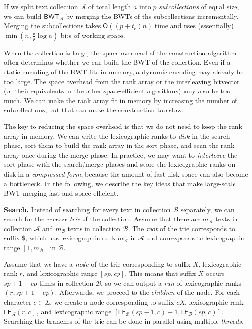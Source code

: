 \documentclass[smallabstract,smallcaptions]{dccpaper}
\newcommand{\Oh}{\ensuremath{\mathsf{O}}}
\newcommand{\BWT}{\textsf{BWT}}
\newcommand{\mBWT}{\ensuremath{\mathsf{BWT}}}
\newcommand{\mLF}{\ensuremath{\mathsf{LF}}}
\newcommand{\Acoll}{\ensuremath{\mathcal{A}}}
\newcommand{\Bcoll}{\ensuremath{\mathcal{B}}}
\begin{document}
\Section{Large-scale \BWT{} merging}

If we split text collection $\Acoll$ of total length $n$ into $p$ \emph{subcollections} of equal size, we can build $\mBWT_{\Acoll}$ by merging the \BWT{}s of the subcollections incrementally. Merging the subcollections takes $\Oh((p+t_{r})n)$ time and uses (essentially) $\min(n, \frac{n}{p} \log n)$ bits of working space.

When the collection is large, the space overhead of the construction algorithm often determines whether we can build the \BWT{} of the collection. Even if a static encoding of the \BWT{} fits in memory, a dynamic encoding may already be too large. The space overhead from the rank array or the interleaving bitvector (or their equivalents in the other space-efficient algorithms) may also be too much. We can make the rank array fit in memory by increasing the number of subcollections, but that can make the construction too slow.

The key to reducing the space overhead is that we do not need to keep the rank array in memory. We can write the lexicographic ranks to \emph{disk} in the search phase, sort them to build the rank array in the sort phase, and scan the rank array once during the merge phase. In practice, we may want to \emph{interleave} the sort phase with the search/merge phases and store the lexicographic ranks on disk in a \emph{compressed form}, because the amount of fast disk space can also become a bottleneck. In the following, we describe the key ideas that make large-scale \BWT{} merging fast and space-efficient.

\smallbreak\noindent\textbf{Search.} Instead of searching for every text in collection $\Bcoll$ separately, we can search for the \emph{reverse trie} of the collection. Assume that there are $m_{\Acoll}$ texts in collection $\Acoll$ and $m_{\Bcoll}$ texts in collection $\Bcoll$. The \emph{root} of the trie corresponds to suffix $\$$, which has lexicographic rank $m_{\Acoll}$ in $\Acoll$ and corresponds to lexicographic range $[1,m_{\Bcoll}]$ in $\Bcoll$.

Assume that we have a \emph{node} of the trie corresponding to suffix $X$, lexicographic rank $r$, and lexicographic range $[sp,ep]$. This means that suffix $X$ occurs $sp+1-ep$ times in collection $\Bcoll$, so we can output a \emph{run} of lexicographic ranks $(r, sp+1-ep)$. Afterwards, we proceed to the \emph{children} of the node. For each character $c \in \Sigma$, we create a node corresponding to suffix $cX$, lexicographic rank $\mLF_{\Acoll}(r,c)$, and lexicographic range $[\mLF_{\Bcoll}(sp-1, c) + 1, \mLF_{\Bcoll}(ep, c)]$. Searching the branches of the trie can be done in parallel using multiple \emph{threads}.
\end{document}
